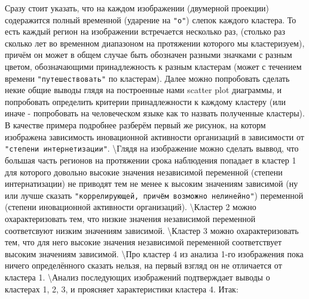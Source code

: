\documentclass[11pt]{article}
\begin{document}
    Сразу стоит указать, что на каждом изображении (двумерной проекции)
содеражится полный временной (ударение на \verb'"о"') слепок каждого
кластера. То есть каждый регион на изображении встречается несколько
раз, (столько раз сколько лет во временном диапазоном на протяжении
которого мы кластеризуем), причём он может в общем случае быть обозначен
разными значками с разным цветом, обозначающими принадлежность к разным
кластерам (может с течением времени \verb'"путешествовать"' по
кластерам). Далее можно попробовать сделать некие общие выводы глядя на
построенные нами scatter plot диаграммы, и попробовать определить
критерии принадлежности к каждому кластеру (или иначе - попробовать на
человеческом языке как то назвать полученные кластеры). В качестве
примера подробнее разберём первый же рисунок, на которм изображена
зависимость иновационной активности организаций в зависимости от
\verb'"степени интернетизации"'. \textbackslash{}Глядя на изображение
можно сделать выввод, что большая часть регионов на протяжении срока
наблюдения попадает в кластер 1 для которого довольно высокие значения
независимой переменной (степени интернатизации) не приводят тем не менее
к высоким значениям зависимой (ну или лучше сказать
\verb'"коррелирующей, причём возможно нелинейно"') переменной (степени
иновационной активности организаций). \textbackslash{}Кластер 2 можно
охарактеризовать тем, что низкие значения независимой переменной
соответсвуют низким значениям зависимой. \textbackslash{}Кластер 3 можно
охарактеризовать тем, что для него высокие значения независимой
переменной соответствует высоким значениям зависимой.
\textbackslash{}Про кластер 4 из анализа 1-го изображения пока ничего
определённого сказать нельзя, на первый взгляд он не отличается от
кластера 1. \textbackslash{}Анализ последующих изображений подтверждает
выводы о кластерах 1, 2, 3, и проясняет характеристики кластера 4. Итак:
\end{document}
